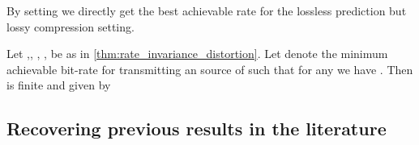 \documentclass[final]{article}
\begin{document}
By setting  we directly get the best achievable rate for the lossless prediction but lossy compression setting. 

\begin{corollary}\label{corr:invariant_source_coding}
Let ,, , ,  be as in \cref{thm:rate_invariance_distortion}.
Let  denote the minimum achievable bit-rate for transmitting an \iid source of  such that for any  we have .
Then   is finite and given by

\end{corollary}

\subsection{Recovering previous results in the literature}
\label{appx:recovering}
\end{document}
